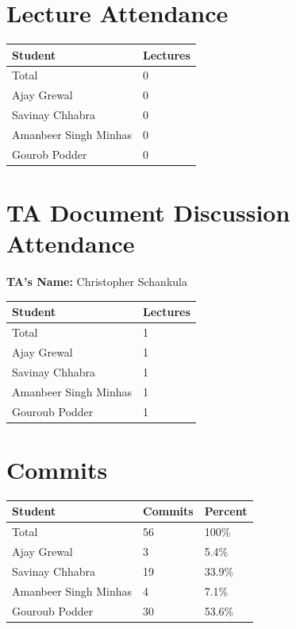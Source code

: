 \documentclass{article}
\begin{document}
\section{Lecture Attendance}

\begin{table}[H]
\centering
\begin{tabular}{ll}
\toprule
\textbf{Student} & \textbf{Lectures}\\
\midrule
Total & 0\\
Ajay Grewal & 0\\
Savinay Chhabra & 0\\
Amanbeer Singh Minhas & 0\\
Gourob Podder & 0\\
\bottomrule
\end{tabular}
\end{table}

\section{TA Document Discussion Attendance}


\noindent \textbf{TA's Name: } Christopher Schankula

\begin{table}[H]
\centering
\begin{tabular}{ll}
\toprule
\textbf{Student} & \textbf{Lectures}\\
\midrule
Total & 1\\
Ajay Grewal & 1\\
Savinay Chhabra & 1\\
Amanbeer Singh Minhas & 1\\
Gouroub Podder & 1\\
\bottomrule
\end{tabular}
\end{table}

\section{Commits}

\begin{table}[H]
\centering
\begin{tabular}{lll}
\toprule
\textbf{Student} & \textbf{Commits} & \textbf{Percent}\\
\midrule
Total & 56 & 100\% \\
Ajay Grewal & 3 & 5.4\% \\
Savinay Chhabra & 19 & 33.9\% \\
Amanbeer Singh Minhas & 4 & 7.1\% \\
Gouroub Podder & 30 & 53.6\% \\
\bottomrule
\end{tabular}
\end{table}
\end{document}
